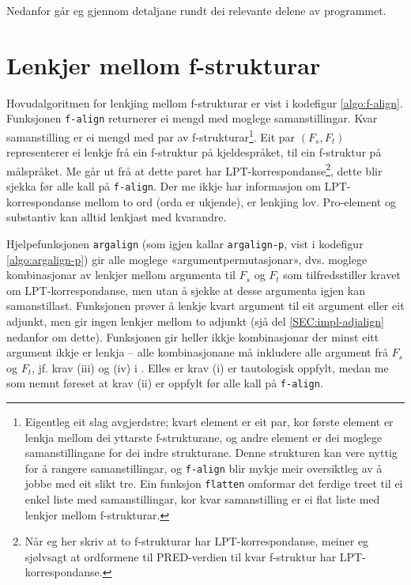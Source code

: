 \documentclass[11pt,a4paper,oneside,draft]{book}
\begin{document}
Nedanfor går eg gjennom detaljane rundt dei relevante delene av
programmet.

\section{Lenkjer mellom f-strukturar}
\label{sec-4.1}

\label{SEC:impl-f-lenkjing}

Hovudalgoritmen for lenkjing mellom f-strukturar er vist i kodefigur
\ref{algo:f-align}. Funksjonen \texttt{f-align} returnerer ei mengd med
moglege samanstillingar. Kvar samanstilling er ei mengd med par av
f-strukturar\footnote{Eigentleg eit slag avgjerdstre; kvart element er eit par, kor
        første element er lenkja mellom dei yttarste f-strukturane, og
        andre element er dei moglege samanstillingane for dei indre
        strukturane. Denne strukturen kan vere nyttig for å rangere
        samanstillingar, og \texttt{f-align} blir mykje meir oversiktleg av å
        jobbe med eit slikt tre. Ein funksjon \texttt{flatten} omformar det
        ferdige treet til ei enkel liste med samanstillingar, kor kvar
        samanstilling er ei flat liste med lenkjer mellom
        f-strukturar. }. Eit par $(F_s,F_t)$ representerer ei lenkje frå
ein f-struktur på kjeldespråket, til ein f-struktur på målspråket. Me
går ut frå at dette paret har LPT-korrespondanse\footnote{Når eg her skriv at to f-strukturar har LPT-korrespondanse,
        meiner eg sjølvsagt at ordformene til PRED-verdien til kvar
        f-struktur har LPT-korrespondanse. }, dette blir
sjekka før alle kall på \texttt{f-align}. Der me ikkje har informasjon om
LPT-korrespondanse mellom to ord (orda er ukjende), er lenkjing
lov. Pro-element og substantiv kan alltid lenkjast med kvarandre.

Hjelpefunksjonen \texttt{argalign} (som igjen kallar \texttt{argalign-p}, vist i
kodefigur \ref{algo:argalign-p}) gir alle moglege
«argumentpermutasjonar», dvs. moglege kombinasjonar av lenkjer mellom
argumenta til $F_s$ og $F_t$ som tilfredsstiller kravet om
LPT-korrespondanse, men utan å sjekke at desse argumenta igjen kan
samanstillast. Funksjonen prøver å lenkje kvart argument til eit
argument eller eit adjunkt, men gir ingen lenkjer mellom to adjunkt
(sjå del \ref{SEC:impl-adjalign} nedanfor om dette). Funksjonen gir
heller ikkje kombinasjonar der minst eitt argument ikkje er lenkja --
alle kombinasjonane må inkludere alle argument frå $F_s$ og $F_t$,
jf. krav (iii) og (iv) i \citet[s.~75]{dyvik2009lmp}. Elles er krav
(i) er tautologisk oppfylt, medan me som nemnt føreset at krav (ii) er
oppfylt før alle kall på \texttt{f-align}.
\end{document}
